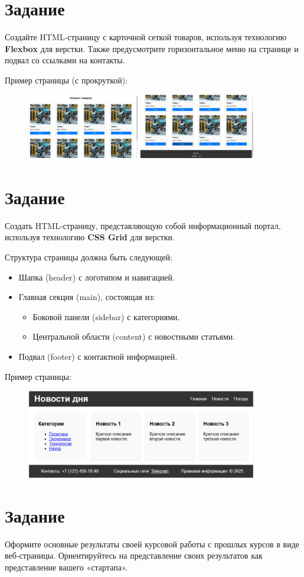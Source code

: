 \documentclass[a4paper,12pt]{extarticle}
\begin{document}
\section{Задание}
Создайте HTML-страницу с карточной сеткой товаров, используя технологию \textbf{Flexbox} для верстки. Также предусмотрите горизонтальное меню на странице и подвал со ссылками на контакты.

Пример страницы (с прокруткой):
\begin{figure}[!ht]
    \centering
    \includegraphics[width=0.9\textwidth]{lab2_task6.png}
\end{figure}

\section{Задание}
Создать HTML-страницу, представляющую собой информационный портал, используя технологию \textbf{CSS Grid} для верстки. 

Структура страницы должна быть следующей:
\begin{itemize}
  \item Шапка (header) с логотипом и навигацией.
  \item Главная секция (main), состоящая из:
  \begin{itemize}
    \item Боковой панели (sidebar) с категориями.
    \item Центральной области (content) с новостными статьями.
  \end{itemize}
  \item Подвал (footer) с контактной информацией.
\end{itemize}

Пример страницы:
\begin{figure}[!ht]
    \centering
    \includegraphics[width=0.9\textwidth]{lab2_task7.png}
\end{figure}

\section{Задание}
Оформите основные результаты своей курсовой работы с прошлых курсов в виде веб-страницы. Ориентируйтесь на представление своих результатов как представление вашего «стартапа».
\end{document}
